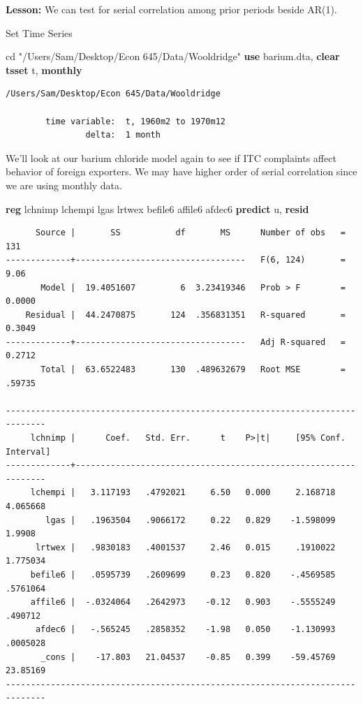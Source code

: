 \documentclass[
]{book}
\newenvironment{Shaded}{\begin{snugshade}}{\end{snugshade}}
\newcommand{\FunctionTok}[1]{\textcolor[rgb]{0.13,0.29,0.53}{\textbf{#1}}}
\newcommand{\KeywordTok}[1]{\textcolor[rgb]{0.13,0.29,0.53}{\textbf{#1}}}
\newcommand{\NormalTok}[1]{#1}
\newcommand{\StringTok}[1]{\textcolor[rgb]{0.31,0.60,0.02}{#1}}
\begin{document}
\textbf{Lesson:} We can test for serial correlation among prior periods beside AR(1).

Set Time Series

\begin{Shaded}
\begin{Highlighting}[]
\NormalTok{cd }\StringTok{"/Users/Sam/Desktop/Econ 645/Data/Wooldridge"}
\KeywordTok{use}\NormalTok{ barium.dta, }\KeywordTok{clear}
\KeywordTok{tsset}\NormalTok{ t, }\FunctionTok{monthly}
\end{Highlighting}
\end{Shaded}

\begin{verbatim}
/Users/Sam/Desktop/Econ 645/Data/Wooldridge

        time variable:  t, 1960m2 to 1970m12
                delta:  1 month
\end{verbatim}

We'll look at our barium chloride model again to see if ITC complaints affect
behavior of foreign exporters. We may have higher order of serial correlation
since we are using monthly data.

\begin{Shaded}
\begin{Highlighting}[]
\KeywordTok{reg}\NormalTok{ lchnimp lchempi lgas lrtwex befile6 affile6 afdec6}
\KeywordTok{predict}\NormalTok{ u, }\KeywordTok{resid}
\end{Highlighting}
\end{Shaded}

\begin{verbatim}
      Source |       SS           df       MS      Number of obs   =       131
-------------+----------------------------------   F(6, 124)       =      9.06
       Model |  19.4051607         6  3.23419346   Prob > F        =    0.0000
    Residual |  44.2470875       124  .356831351   R-squared       =    0.3049
-------------+----------------------------------   Adj R-squared   =    0.2712
       Total |  63.6522483       130  .489632679   Root MSE        =    .59735

------------------------------------------------------------------------------
     lchnimp |      Coef.   Std. Err.      t    P>|t|     [95% Conf. Interval]
-------------+----------------------------------------------------------------
     lchempi |   3.117193   .4792021     6.50   0.000     2.168718    4.065668
        lgas |   .1963504   .9066172     0.22   0.829    -1.598099      1.9908
      lrtwex |   .9830183   .4001537     2.46   0.015     .1910022    1.775034
     befile6 |   .0595739   .2609699     0.23   0.820    -.4569585    .5761064
     affile6 |  -.0324064   .2642973    -0.12   0.903    -.5555249     .490712
      afdec6 |   -.565245   .2858352    -1.98   0.050    -1.130993    .0005028
       _cons |    -17.803   21.04537    -0.85   0.399    -59.45769    23.85169
------------------------------------------------------------------------------
\end{verbatim}
\end{document}
